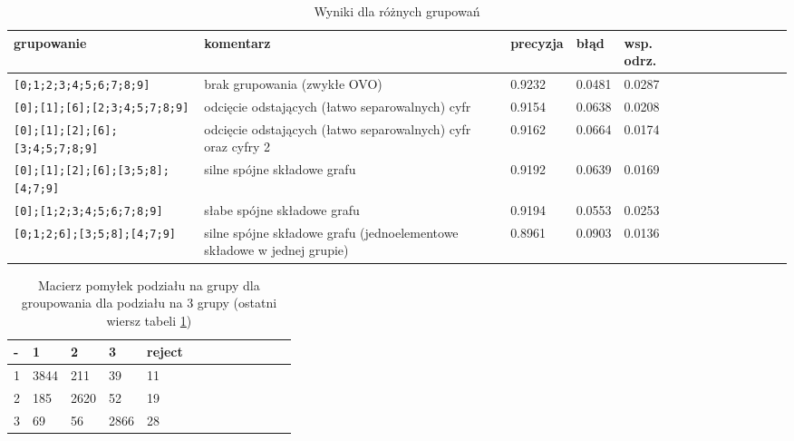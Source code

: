 \documentclass[a4paper]{article}
\begin{document}
\begin{table}[H]
    \caption{Wyniki dla różnych grupowań
    \label{table:grouping}
    }
\begin{center}
    \begin{tabular}{| l | p{45mm} | l | l | l | l | l | l | l | l | l | l | l |}
    \hline
        grupowanie & komentarz & precyzja & błąd & wsp. odrz. \\
    \hline
        \verb|[0;1;2;3;4;5;6;7;8;9]| & brak grupowania \newline (zwykłe OVO) &0.9232  &  0.0481   & 0.0287 \\
    \hline
        \verb|[0];[1];[6];[2;3;4;5;7;8;9]| & odcięcie odstających \newline (łatwo separowalnych) cyfr & 0.9154   &0.0638 &  0.0208 \\

    \hline
        \verb|[0];[1];[2];[6];[3;4;5;7;8;9]| & odcięcie odstających \newline (łatwo separowalnych) cyfr \newline oraz cyfry 2& 0.9162 &  0.0664 &  0.0174 \\
    \hline
        \verb|[0];[1];[2];[6];[3;5;8];[4;7;9]| & silne spójne składowe grafu & 0.9192  & 0.0639 &  0.0169 \\
    \hline
        \verb|[0];[1;2;3;4;5;6;7;8;9]| & słabe spójne składowe grafu & 0.9194 &  0.0553 &  0.0253 \\
    \hline
        \verb|[0;1;2;6];[3;5;8];[4;7;9]| & silne spójne składowe grafu (jednoelementowe składowe w jednej grupie) & 0.8961 &  0.0903 &  0.0136 \\
    \hline

    \end{tabular}
\end{center}
\end{table}


\begin{table}[H]
    \caption{Macierz pomyłek podziału na grupy dla groupowania dla podziału na 3 grupy (ostatni wiersz tabeli \ref{table:grouping})
    \label{table:groupConf}
    }
\begin{center}
    \begin{tabular}{| l | l | l | l | l | l | l | l | l | l | l | l | l |}
    \hline
        - & 1 & 2 & 3 & reject \\
    \hline
        1  &  3844 &   211&     39  &   11 \\
        2  &  185  & 2620 &    52   &  19 \\
        3  &  69   &  56  & 2866    & 28 \\
    \hline
    \end{tabular}
\end{center}
\end{table}
\end{document}

